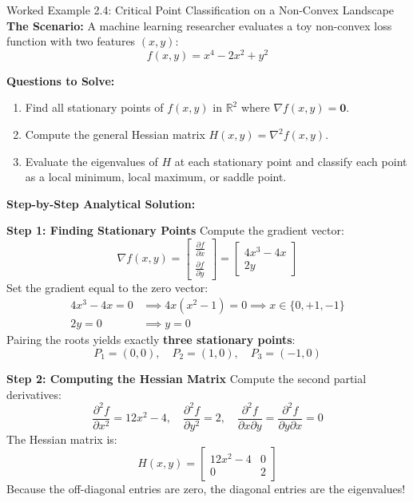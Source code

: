 \begin{examplebox}[breakable]{Worked Example 2.4: Critical Point Classification on a Non-Convex Landscape}
\label{ex:w02_critical_point_classification}
\textbf{The Scenario:}
A machine learning researcher evaluates a toy non-convex loss function with two features $(x, y)$:
\begin{equation*}
f(x, y) = x^4 - 2x^2 + y^2
\end{equation*}

\textbf{Questions to Solve:}
\begin{enumerate}
    \item Find all stationary points of $f(x, y)$ in $\mathbb{R}^2$ where $\nabla f(x, y) = \mathbf{0}$.
    \item Compute the general Hessian matrix $H(x, y) = \nabla^2 f(x, y)$.
    \item Evaluate the eigenvalues of $H$ at each stationary point and classify each point as a local minimum, local maximum, or saddle point.
\end{enumerate}

\tcblower
\textbf{Step-by-Step Analytical Solution:}

\textbf{Step 1: Finding Stationary Points}
Compute the gradient vector:
\begin{equation*}
\nabla f(x, y) = \begin{bmatrix} \frac{\partial f}{\partial x} \\ \frac{\partial f}{\partial y} \end{bmatrix} = \begin{bmatrix} 4x^3 - 4x \\ 2y \end{bmatrix}
\end{equation*}
Set the gradient equal to the zero vector:
\begin{align*}
4x^3 - 4x = 0 &\implies 4x(x^2 - 1) = 0 \implies x \in \{0, +1, -1\} \\
2y = 0 &\implies y = 0
\end{align*}
Pairing the roots yields exactly \textbf{three stationary points}:
\begin{equation*}
P_1 = (0, 0), \quad P_2 = (1, 0), \quad P_3 = (-1, 0)
\end{equation*}

\textbf{Step 2: Computing the Hessian Matrix}
Compute the second partial derivatives:
\begin{equation*}
\frac{\partial^2 f}{\partial x^2} = 12x^2 - 4, \quad \frac{\partial^2 f}{\partial y^2} = 2, \quad \frac{\partial^2 f}{\partial x \partial y} = \frac{\partial^2 f}{\partial y \partial x} = 0
\end{equation*}
The Hessian matrix is:
\begin{equation*}
H(x, y) = \begin{bmatrix} 12x^2 - 4 & 0 \\ 0 & 2 \end{bmatrix}
\end{equation*}
Because the off-diagonal entries are zero, the diagonal entries are the eigenvalues!


\end{examplebox}
